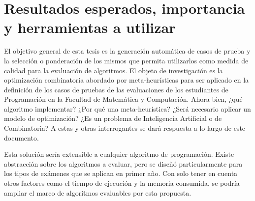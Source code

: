 \documentclass[a4paper,12pt]{book}
\begin{document}

		
		
		
	\section{Resultados esperados, importancia y herramientas a utilizar}
	
		El objetivo general de esta tesis es la generación automática de casos de prueba y la selección o ponderación de los mismos que permita utilizarlos como medida de calidad para la evaluación de algoritmos. El objeto de investigación es la optimización combinatoria abordado por meta-heurísticas \cite{OptimizacionCombinatoria} para ser aplicado en la definición de los casos de pruebas de las evaluaciones de los estudiantes de Programación en la Facultad de Matemática y Computación. Ahora bien, ¿qué algoritmo implementar? ¿Por qué una meta-heurística? ¿Será necesario aplicar un modelo de optimización? ¿Es un problema de Inteligencia Artificial o de Combinatoria? A estas y otras interrogantes se dará respuesta a lo largo de este documento.
		
		Esta solución sería extensible a cualquier algoritmo de programación. Existe abstracción sobre los algoritmos a evaluar, pero se diseñó particularmente para los tipos de exámenes que se aplican en primer año. Con solo tener en cuenta otros factores como el tiempo de ejecución y la memoria consumida, se podría ampliar el marco de algoritmos evaluables por esta propuesta.  
		
		
	
	
	
	
\end{document}
